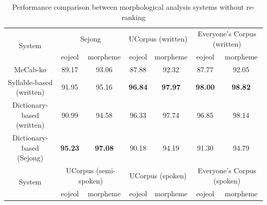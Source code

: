 \documentclass[AMS,STIX2COL]{WileyNJD-v2}
\begin{document}
    \begin{table}[h]
        \caption{Performance comparison between morphological analysis systems without re-ranking}
        \label{tab:performance-without-reranking}
        \begin{tabular*}{500pt}{@{\extracolsep\fill}c|cccccc@{\extracolsep\fill}}
            \toprule
            \multirow{2}{*}{System}                & \multicolumn{2}{c}{Sejong}                                & \multicolumn{2}{c}{UCorpus (written)}                     & \multicolumn{2}{c}{Everyone's Corpus (written)}           \\
            \cmidrule{2-3} \cmidrule{4-5} \cmidrule{6-7}
            ~                                      & \multicolumn{1}{c}{eojeol} & \multicolumn{1}{c}{morpheme} & \multicolumn{1}{c}{eojeol} & \multicolumn{1}{c}{morpheme} & \multicolumn{1}{c}{eojeol} & \multicolumn{1}{c}{morpheme} \\
            \midrule
            \hspace{2mm}MeCab-ko                   & 89.17                      & 93.06                        & 87.88                      & 92.32                        & 87.77                      & 92.05                        \\
            \hspace{2mm}Syllable-based (written)   & 91.95                      & 95.16                        & \textbf{96.84}             & \textbf{97.97}               & \textbf{98.00}             & \textbf{98.82}               \\
            \hspace{2mm}Dictionary-based (written) & 90.99                      & 94.58                        & 96.33                      & 97.74                        & 96.85                      & 98.14                        \\
            \hspace{2mm}Dictionary-based (Sejong)  & \textbf{95.23}             & \textbf{97.08}               & 90.18                      & 94.19                        & 91.30                      & 94.79                        \\
            \toprule
            \multirow{2}{*}{System}                & \multicolumn{2}{c}{UCorpus (semi-spoken)}                 & \multicolumn{2}{c}{UCorpus (spoken)}                      & \multicolumn{2}{c}{Everyone's Corpus (spoken)}            \\
            \cmidrule{2-3} \cmidrule{4-5} \cmidrule{6-7}
            ~                                      & \multicolumn{1}{c}{eojeol} & \multicolumn{1}{c}{morpheme} & \multicolumn{1}{c}{eojeol} & \multicolumn{1}{c}{morpheme} & \multicolumn{1}{c}{eojeol} & \multicolumn{1}{c}{morpheme} \\

\end{tabular*}
\end{table}
\end{document}
